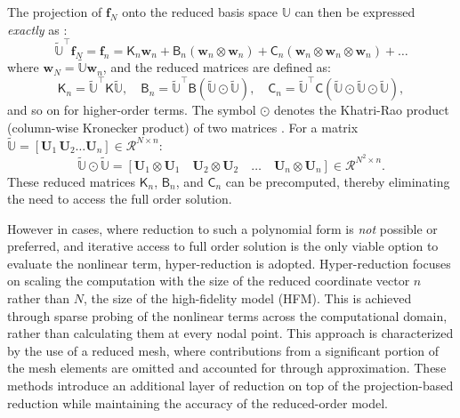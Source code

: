 \documentclass[11pt]{article}
\renewcommand{\vec}[1]{\mathbf{#1}}
\newcommand{\mat}[1]{\mathsf{#1}}
\begin{document}
        The projection of $\mathbf{f}_N$ onto the reduced basis space $\mathbb{U}$ can then be expressed \textit{exactly} as \cite{ghattas2021learning}:
        \begin{equation}
        \widetilde{\mathbb{U}}^\top\vec{f}_N = \mathbf{f}_n =  \mat{K}_n \mathbf{w}_n + \mat{B}_n (\mathbf{w}_n \otimes \mathbf{w}_n) + \mat{C}_n (\mathbf{w}_n \otimes \mathbf{w}_n \otimes \mathbf{w}_n) + \dots
        \label{eq:red_poly_non}
        \end{equation}
        where $\vec{w}_N=\widetilde{\mathbb{U}}\vec{w}_n$, and the reduced matrices are defined as:
        \begin{equation}
        \mat{K}_n = \widetilde{\mathbb{U}}^\top \mat{K} \widetilde{\mathbb{U}}, \quad \mat{B}_n = \widetilde{\mathbb{U}}^\top \mat{B} (\widetilde{\mathbb{U}} \odot \widetilde{\mathbb{U}}), \quad \mat{C}_n = \widetilde{\mathbb{U}}^\top \mat{C} (\widetilde{\mathbb{U}} \odot \widetilde{\mathbb{U}} \odot \widetilde{\mathbb{U}}),
        \label{eq:red_matrices}
        \end{equation}
        and so on for higher-order terms.
        The symbol \(\odot\) denotes the Khatri-Rao product (column-wise Kronecker product) of two matrices \cite{kolda2009tensor}.
        For a matrix $\widetilde{\mathbb{U}} = [\vec{U}_1\, \vec{U}_2 \ldots \vec{U}_n] \in \mathcal{R}^{N \times n}$:
        \begin{equation}
        \widetilde{\mathbb{U}} \odot \widetilde{\mathbb{U}} = [\mathbf{U}_1 \otimes \mathbf{U}_1 \quad \mathbf{U}_2 \otimes \mathbf{U}_2 \quad \ldots \quad \mathbf{U}_n \otimes \mathbf{U}_n] \in \mathcal{R}^{N^2 \times n}.
        \end{equation}
        These reduced matrices $\mat{K}_n$, $\mat{B}_n$, and $\mat{C}_n$ can be precomputed, thereby eliminating the need to access the full order solution.


        However in cases, where reduction to such a polynomial form is \textit{not} possible or preferred, and iterative access to full order solution is the only viable option to evaluate the nonlinear term, hyper-reduction is adopted.
        Hyper-reduction focuses on scaling the computation with the size of the reduced coordinate vector $n$ rather than $N$, the size of the high-fidelity model (HFM).
        This is achieved through sparse probing of the nonlinear terms across the computational domain, rather than calculating them at every nodal point.
        This approach is characterized by the use of a reduced mesh, where contributions from a significant portion of the mesh elements are omitted and accounted for through approximation.
        These methods introduce an additional layer of reduction on top of the projection-based reduction while maintaining the accuracy of the reduced-order model.
\end{document}
